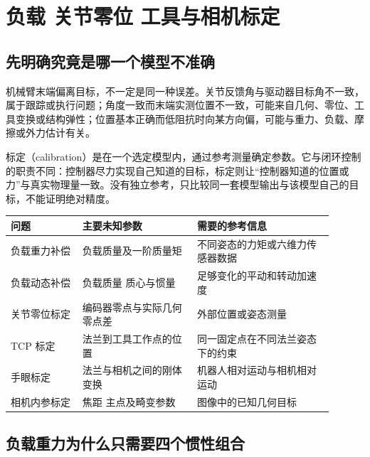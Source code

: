 \chapter{负载 关节零位 工具与相机标定}\label{ch:calibration}
\section{先明确究竟是哪一个模型不准确}
机械臂末端偏离目标，不一定是同一种误差。关节反馈角与驱动器目标角不一致，属于跟踪或执行问题；角度一致而末端实测位置不一致，可能来自几何、零位、工具变换或结构弹性；位置基本正确而低阻抗时向某方向偏，可能与重力、负载、摩擦或外力估计有关。

标定（calibration）是在一个选定模型内，通过参考测量确定参数。它与闭环控制的职责不同：控制器尽力实现自己知道的目标，标定则让“控制器知道的位置或力”与真实物理量一致。没有独立参考，只比较同一套模型输出与该模型自己的目标，不能证明绝对精度。

\begin{longtable}{p{0.20\linewidth}p{0.32\linewidth}p{0.38\linewidth}}
\toprule 问题&主要未知参数&需要的参考信息\\\midrule\endhead
负载重力补偿&负载质量及一阶质量矩&不同姿态的力矩或六维力传感器数据\\
负载动态补偿&负载质量 质心与惯量&足够变化的平动和转动加速度\\
关节零位标定&编码器零点与实际几何零点差&外部位置或姿态测量\\
TCP 标定&法兰到工具工作点的位置&同一固定点在不同法兰姿态下的约束\\
手眼标定&法兰与相机之间的刚体变换&机器人相对运动与相机相对运动\\
相机内参标定&焦距 主点及畸变参数&图像中的已知几何目标\\\bottomrule
\end{longtable}

\section{负载重力为什么只需要四个惯性组合}
